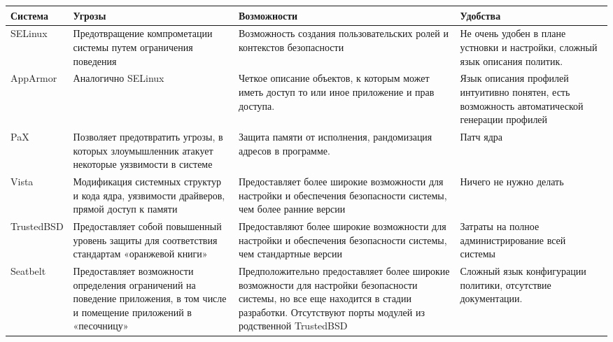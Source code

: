 \bigskip
\begin{tabular}{|p{2cm}|p{4cm}|p{4cm}|p{4cm}|}
\hline
Система & Угрозы & Возможности & Удобства \\
\hline
\ttfamily SELinux 
& 
Предотвращение компрометации системы путем 
ограничения поведения 
& 
Возможность создания пользовательских ролей и 
контекстов безопасности 
& 
Не очень удобен в плане устновки и настройки, 
сложный язык описания политик.\\
\hline 
\ttfamily AppArmor
&
Аналогично SELinux
&
Четкое описание объектов, к которым может иметь 
доступ то или иное приложение и прав доступа.
&
Язык описания профилей интуитивно понятен, 
есть возможность автоматической генерации профилей \\
\hline 
\ttfamily PaX
&
Позволяет предотвратить угрозы, в которых
злоумышленник атакует некоторые уязвимости в системе
&
Защита памяти от исполнения, рандомизация адресов в программе.
&
Патч ядра \\ 
\hline 
\ttfamily Vista
& 
Модификация системных структур и кода ядра, уязвимости 
драйверов, прямой доступ к памяти
&
Предоставляет более широкие возможности для 
настройки и обеспечения безопасности системы, 
чем более ранние версии
&
Ничего не нужно делать\\
\hline
\ttfamily TrustedBSD
&
Предоставляет собой повышенный уровень защиты 
для соответствия стандартам «оранжевой книги»
&
Предоставляют более широкие возможности для 
настройки и обеспечения безопасности системы, 
чем стандартные версии 
&
Затраты на полное администрирование всей системы\\
\hline
\ttfamily Seatbelt
& 
Предоставляет возможности определения ограничений на 
поведение приложения, в том числе и помещение 
приложений в «песочницу»
&
Предположительно предоставляет более широкие возможности 
для настройки безопасности системы,  но все еще находится 
в стадии разработки. Отсутствуют порты модулей из 
родственной TrustedBSD
&
Сложный язык конфигурации политики, отсутствие 
документации. \\
\hline
\end{tabular}

\newpage

